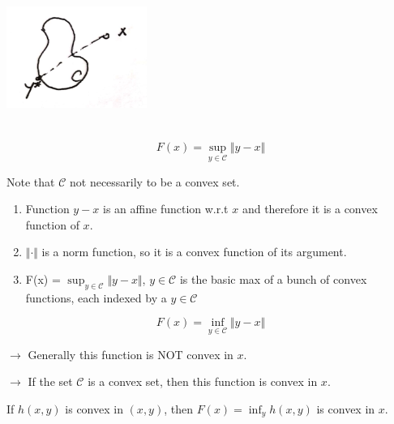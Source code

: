 \begin{example}
\begin{marginfigure}
	\centering
	\includegraphics[width=1.8in,height=1.8in]{figures/ch08/figure1104_1.png}
\end{marginfigure}

\begin{equation*}
F(x) = \sup_{y\in \mathcal{C}}\Vert y-x\Vert
\end{equation*}

Note that $\mathcal{C}$ not necessarily to be a convex set. 

\begin{enumerate}
	\item Function $y-x$ is an affine function w.r.t $x$ and therefore it is a convex function of $x$.
	
	\item $\Vert\cdot\Vert$ is a norm function, so it is a convex function of its argument. 
	
	\item F(x) = $\sup_{y\in \mathcal{C}}\Vert y-x\Vert$, $y\in \mathcal{C}$ is the basic max of a bunch of convex functions, each indexed by a $y\in \mathcal{C}$
\end{enumerate}
\end{example}



\begin{example}
\begin{equation*}
F(x) =\inf_{y\in \mathcal{C}}\Vert y-x\Vert
\end{equation*}

$\rightarrow$ Generally this function is NOT convex in $x$.

$\rightarrow$ If the set $\mathcal{C}$ is a convex set, then this function is convex in $x$. 
\end{example}




\begin{theorem}
 If $h(x, y)$ is convex in $(x,y)$, then $F(x) = \inf_yh(x,y)$ is convex in $x$.
\end{theorem}

